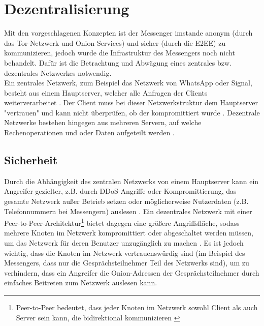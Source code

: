 \documentclass[a4paper,ngerman, headheight=28pt,12pt]{scrartcl}
\newcommand{\vcite}[1]{\cite[vgl.][]{#1}}
\begin{document}
\section{Dezentralisierung}
Mit den vorgeschlagenen Konzepten ist der Messenger imstande anonym (durch das Tor-Netzwerk und Onion Services) und sicher (durch die E2EE) zu kommunizieren, jedoch wurde die Infrastruktur des Messengers noch nicht behandelt. Dafür ist die Betrachtung und Abwägung eines zentrales bzw. dezentrales Netzwerkes notwendig. \\
Ein zentrales Netzwerk, zum Beispiel das Netzwerk von WhatsApp oder Signal, besteht aus einem Hauptserver, welcher alle Anfragen der Clients weiterverarbeitet \vcite{WhatsappCentralized,SignalCentralized, CentralizedDefinition}.
Der Client muss bei dieser Netzwerkstruktur dem Hauptserver "vertrauen" und kann nicht überprüfen, ob der kompromittiert wurde \vcite{MessagingNetwork}. Dezentrale Netzwerke bestehen hingegen aus mehreren Servern, auf welche Rechenoperationen und oder Daten aufgeteilt werden \vcite{DecentralizedDefinition}.


\subsection{Sicherheit}
Durch die Abhängigkeit des zentralen Netzwerks von einem Hauptserver kann ein Angreifer gezielter, z.B. durch DDoS-Angriffe oder Kompromittierung, das gesamte Netzwerk außer Betrieb setzen oder möglicherweise Nutzerdaten (z.B. Telefonnummern bei Messengern) auslesen \vcite{CentralizedAttacks}.
Ein dezentrales Netzwerk mit einer Peer-to-Peer-Architektur\footnote{Peer-to-Peer bedeutet, dass jeder Knoten im Netzwerk sowohl Client als auch Server sein kann, die bidirektional kommunizieren \vcite{PeerToPeerDef}} bietet dagegen eine größere Angriffsfläche, sodass mehrere Knoten im Netzwerk kompromittiert oder abgeschaltet werden müssen, um das Netzwerk für deren Benutzer unzugänglich zu machen \vcite{GeeksCentralizeDecentralized}.
Es ist jedoch wichtig, dass die Knoten im Netzwerk vertrauenswürdig sind (im Beispiel des Messengers, dass nur die Gesprächsteilnehmer Teil des Netzwerks sind), um zu verhindern, dass ein Angreifer die Onion-Adressen der Gesprächsteilnehmer durch einfaches Beitreten zum Netzwerk auslesen kann.
\end{document}
